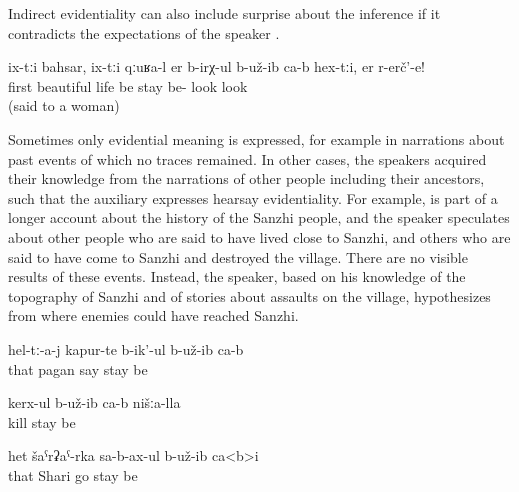 Indirect evidentiality can also include surprise about the inference if it contradicts the expectations of the speaker .
%
\begin{exe}
	\ex	\label{ex:(It turned out) they lived well first, look@15}
	\gll	ix-tːi	bahsar,	ix-tːi	qːuʁa-l	er b-irχ-ul	b-už-ib ca-b	hex-tːi,	er	r-erč'-e!\\
			first		beautiful	life be	stay be-		look	look\\
	\glt	{} (said to a woman)
\end{exe}

Sometimes only evidential meaning is expressed, for example in narrations about past events of which no traces remained. In other cases, the speakers acquired their knowledge from the narrations of other people including their ancestors, such that the auxiliary expresses hearsay evidentiality. For example,  is part of a longer account about the history of the Sanzhi people, and the speaker speculates about other people who are said to have lived close to Sanzhi, and others who are said to have come to Sanzhi and destroyed the village. There are no visible results of these events. Instead, the speaker, based on his knowledge of the topography of Sanzhi and of stories about assaults on the village, hypothesizes from where enemies could have reached Sanzhi.
%
\begin{exe}
	\ex	\label{ex:pagans invaded from Shari}
	\begin{xlist}
		\ex	\label{ex:They were (apparently) called pagans}
		\gll	hel-tː-a-j	kapur-te	b-ik'-ul	b-už-ib	ca-b\\
			that	pagan	say	stay	be\\
		\glt	{}
	
		\ex	\label{ex:They apparently killed our (people)}
		\gll	kerx-ul	b-už-ib	ca-b		nišːa-lla\\
			kill	stay	be		\\
		\glt	{}
	
		\ex	\label{ex:They came from Shari (to us)@16}
		\gll	het	šaˁrʡaˁ-rka	sa-b-ax-ul	b-už-ib ca<b>i\\
			that	Shari	go	stay be\\
		\glt	{}
	\end{xlist}
\end{exe}

